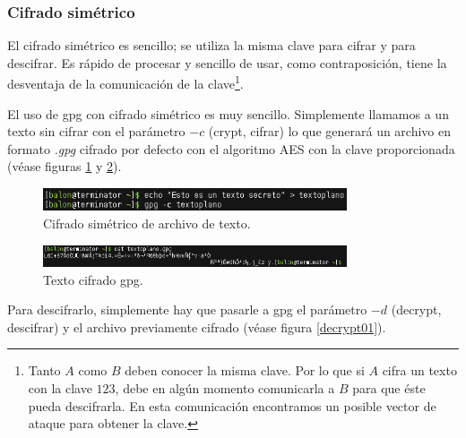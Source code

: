 \documentclass[a4paper, 11pt, titlepage]{book}
\begin{document}
            \subsubsection{Cifrado simétrico}
    
                El cifrado simétrico es sencillo; se utiliza la misma clave para cifrar y para descifrar.
                Es rápido de procesar y sencillo de usar, como contraposición, tiene la desventaja de la 
                comunicación de la clave\footnote{
                    Tanto $A$ como $B$ deben conocer la misma clave. Por lo que si $A$ cifra un texto con
                    la clave $123$, debe en algún momento comunicarla a $B$ para que éste pueda descifrarla.
                    En esta comunicación encontramos un posible vector de ataque para obtener la clave.
                }.
    
                El uso de gpg con cifrado simétrico es muy sencillo. Simplemente llamamos a un texto sin cifrar
                con el parámetro $-c$ (crypt, cifrar) lo que generará un archivo en formato \textit{.gpg} cifrado
                por defecto con el algoritmo AES con la clave proporcionada (véase figuras \ref{crypt01} y 
                \ref{crypt02}).
    
                \begin{figure}[htp]
                    \centering
                    \includegraphics[width=0.8\textwidth]{resources/crypt01.png}
                    \caption{Cifrado simétrico de archivo de texto.}
                    \label{crypt01}
                \end{figure}
    
                \begin{figure}[htp]
                    \centering
                    \includegraphics[width=0.8\textwidth]{resources/crypt02.png}
                    \caption{Texto cifrado gpg.}
                    \label{crypt02}
                \end{figure}
    
                Para descifrarlo, simplemente hay que pasarle a gpg el parámetro $-d$ (decrypt, descifrar) y el archivo 
                previamente cifrado (véase figura \ref{decrypt01}).
    
\end{document}
